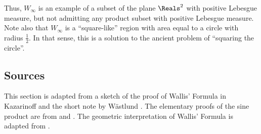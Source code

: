 \documentclass[12pt]{article}
\begin{document}
Thus, \( W_{\infty} \) is an example of a subset of the plane \( \Reals^2
\) with positive Lebesgue measure, but not admitting any product subset
with positive Lebesgue measure.  Note also that \( W_{\infty} \) is a
``square-like'' region with area equal to a circle with radius \( \frac{1}
{2} \).  In that sense, this is a solution to the ancient problem of
``squaring the circle''.

\subsection*{Sources}

This section is adapted from a sketch of the proof of Wallis' Formula in
Kazarinoff
\cite{kazarinoff61} and the short note by W\"{a}stlund
\cite{wastlund07}.  The elementary proofs of the sine product are from
\cite{kortram96} and
\cite{holst12}. The geometric interpretation of Wallis' Formula is
adapted from
\cite{rummler}.

\hr

\end{document}
